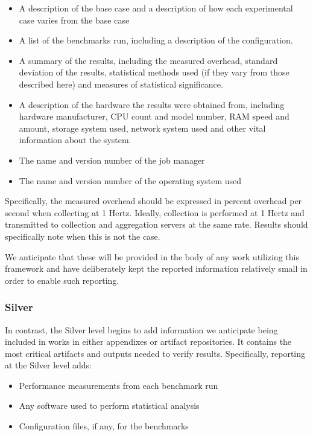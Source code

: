 \documentclass[conference]{IEEEtran}
\begin{document}
\begin{itemize}
    \item A description of the base case and a description of how each 
    experimental case varies from the base case
    \item A list of the benchmarks run, including a description of the 
    configuration.
    \item A summary of the results, including the measured overhead, standard 
    deviation of the results, statistical methods used (if they vary from those 
    described here) and measures of statistical significance.
    \item A description of the hardware the results were obtained from, 
    including hardware manufacturer, CPU count and model number, RAM speed and 
    amount, storage system used, network system used and other vital 
    information about the system.
    \item The name and version number of the job manager
    \item The name and version number of the operating system used
\end{itemize}

Specifically, the measured overhead should be expressed in percent overhead per 
second when collecting at 1 Hertz. Ideally, collection is performed at 1 Hertz
and transmitted to collection and aggregation servers at the same rate. 
Results should specifically note when this is not the case.

We anticipate that these will be provided in the body of any work utilizing 
this framework and have deliberately kept the reported information relatively 
small in order to enable such reporting.

\subsubsection{Silver}

In contrast, the Silver level begins to add information we anticipate being 
included in works in either appendixes or artifact repositories. It contains 
the most critical artifacts and outputs needed to verify results. Specifically, 
reporting at the Silver level adds:

\begin{itemize}
    \item Performance measurements from each benchmark run
    \item Any software used to perform statistical analysis
    \item Configuration files, if any, for the benchmarks
\end{itemize}
\end{document}
